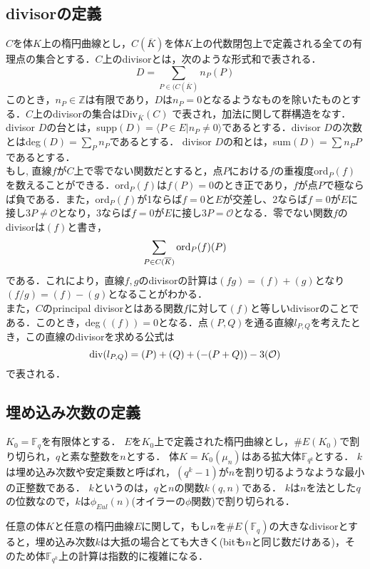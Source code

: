 \subsection{divisorの定義}
$C$を体$K$上の楕円曲線とし，$C(\overline{K})$を体$K$上の代数閉包上で定義される全ての有理点の集合とする．$C$上のdivisorとは，次のような形式和で表される．
\[
D=\sum\limits_{P\in (C(\overline{K})}n_P(P)
\]
このとき，$n_P\in \mathbb {Z}$は有限であり，$D$は$n_P=0$となるようなものを除いたものとする．$C$上のdivisorの集合はDiv$_{\overline{K}}(C)$
で表され，加法に関して群構造をなす．divisor $D$の台とは，supp$(D) = \langle P \in E|n_P \neq 0 \rangle$であるとする．divisor $D$の次数とはdeg$(D)=\sum\limits_{P}n_P$であるとする． divisor $D$の和とは，sum$(D)=\sum n_PP$であるとする．\\
もし, 直線$f$が$C$上で零でない関数だとすると，点$P$における$f$の重複度ord$_P(f)$を数えることができる．ord$_P(f)$は$f(P)=0$のとき正であり，$f$が点$P$で極ならば負である．また，ord$_P(f)$が1ならば$f=0$と$E$が交差し、2ならば$f=0$が$E$に接し$3P\neq \mathcal{O}$となり，3ならば$f=0$が$E$に接し$3P=\mathcal{O}$となる．零でない関数$f$のdivisorは$(f)$と書き，
\[
\sum\limits_{P\in C(\overline K)}{\rm ord}_P(f)(P)
\]
である．これにより，直線$f,g$のdivisorの計算は$(fg)=(f)+(g)$となり$(f/g)=(f)-(g)$となることがわかる．\\
また，$C$のprincipal divisorとはある関数$f$に対して$(f)$と等しいdivisorのことである．このとき，deg$((f))=0$となる．点$(P,Q)$を通る直線$l_{P,Q}$を考えたとき，この直線のdivisorを求める公式は
\[
{\rm div}(l_{P,Q})=(P)+(Q)+(-(P+Q))-3(\mathcal{O})
\]
で表される．
\par
\subsection{埋め込み次数の定義}
$K _0 = \mathbb{F} _q$を有限体とする．
$E$を$K _0$上で定義された楕円曲線とし，$\# E(K _0)$で割り切られ，$q$と素な整数を$n$とする．
体$K = K _0 (\mu _n)$はある拡大体$\mathbb{F} _{q ^{k}}$とする．
$k$は埋め込み次数や安定乗数と呼ばれ，$(q ^k -1)$が$n$を割り切るようなような最小の正整数である．
$k$というのは，$q$と$n$の関数$k(q, n)$である．
$k$は$n$を法とした$q$の位数なので，$k$は$\phi  _{Eul} (n)$(オイラーの$\phi$関数)で割り切られる．
\par
任意の体$K$と任意の楕円曲線$E$に関して，もし$n$を$\# E(\mathbb{F} _q)$の大きなdivisorとすると，埋め込み次数$k$は大抵の場合とても大きく(bitも$n$と同じ数だけある)，そのため体$\mathbb{F} _{q ^k}$上の計算は指数的に複雑になる．\\
\par
